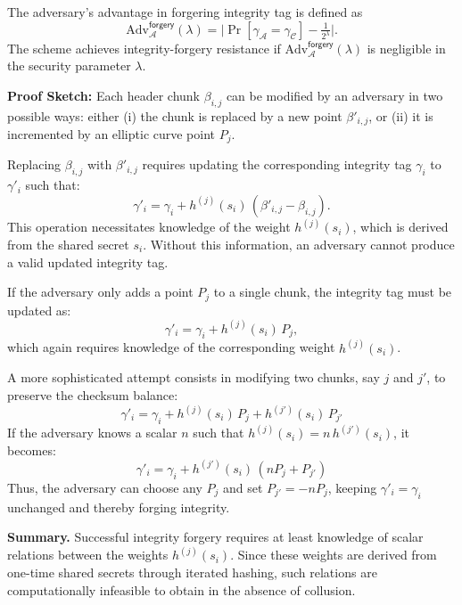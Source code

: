 \noindent The adversary's advantage in forgering integrity tag is defined as
$$
\mathrm{Adv}^{\mathsf{forgery}}_{\mathcal{A}}(\lambda)
= \big| \Pr[\gamma_\mathcal{A} = \gamma_\mathcal{C}] - \tfrac{1}{2^{\lambda}} \big|.
$$
The scheme achieves integrity-forgery resistance if $\mathrm{Adv}^{\mathsf{forgery}}_{\mathcal{A}}(\lambda)$ is negligible in the security parameter $\lambda$.
\newline

\noindent\textbf{Proof Sketch:}
Each header chunk $\beta_{i,j}$ can be modified by an adversary in two possible ways: 
either (i) the chunk is replaced by a new point $\beta'_{i,j}$, or (ii) it is incremented by an elliptic curve point $P_j$.
\newline

Replacing $\beta_{i,j}$ with $\beta'_{i,j}$ requires updating the corresponding integrity tag $\gamma_i$ to $\gamma'_i$ such that:
$$
\gamma'_i = \gamma_i + h^{(j)}(s_i)\, (\beta'_{i,j} - \beta_{i,j}).
$$
This operation necessitates knowledge of the weight $h^{(j)}(s_i)$, which is derived from the shared secret $s_i$. 
Without this information, an adversary cannot produce a valid updated integrity tag.
\newline

If the adversary only adds a point $P_j$ to a single chunk, the integrity tag must be updated as:
$$
\gamma'_i = \gamma_i + h^{(j)}(s_i)\, P_j,
$$
which again requires knowledge of the corresponding weight $h^{(j)}(s_i)$.
\newline

A more sophisticated attempt consists in modifying two chunks, say $j$ and $j'$, to preserve the checksum balance:
$$
\gamma'_i = \gamma_i + h^{(j)}(s_i)\, P_j + h^{(j')}(s_i)\, P_{j'}
$$
If the adversary knows a scalar $n$ such that $h^{(j)}(s_i) = n\,h^{(j')}(s_i)$,  it becomes:
$$
\gamma'_i = \gamma_i + h^{(j')}(s_i)\, (n P_j + P_{j'})
$$
Thus, the adversary can choose any $P_j$ and set $P_{j'} = -n P_j$, keeping $\gamma'_i = \gamma_i$ unchanged and thereby forging integrity.  
\newline

\noindent\textbf{Summary.}
Successful integrity forgery requires at least knowledge of scalar relations between the weights $h^{(j)}(s_i)$.  
Since these weights are derived from one-time shared secrets through iterated hashing, such relations are computationally infeasible to obtain in the absence of collusion.
\newline

